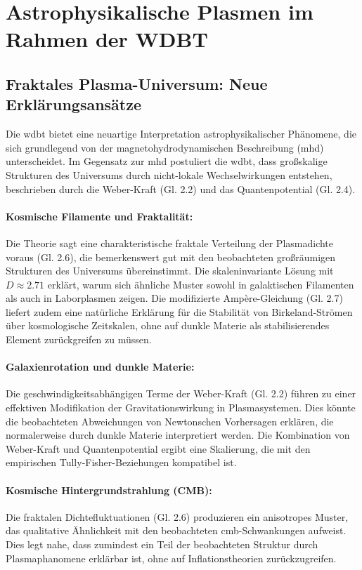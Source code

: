 \chapter{Astrophysikalische Plasmen im Rahmen der WDBT}
\section{Fraktales Plasma-Universum: Neue Erklärungsansätze}
Die \gls{wdbt} bietet eine neuartige Interpretation astrophysikalischer Phänomene, die sich grundlegend von der magnetohydrodynamischen Beschreibung (\gls{mhd}) unterscheidet. Im Gegensatz zur \gls{mhd}
postuliert die \gls{wdbt}, dass großskalige Strukturen des Universums durch nicht-lokale Wechselwirkungen entstehen, beschrieben durch die Weber-Kraft (Gl. 2.2) und das Quantenpotential (Gl. 2.4).

\subsubsection{Kosmische Filamente und Fraktalität:}
Die Theorie sagt eine charakteristische fraktale Verteilung der Plasmadichte voraus (Gl. 2.6), die bemerkenswert gut mit den beobachteten großräumigen Strukturen des Universums übereinstimmt. Die
skaleninvariante Lösung mit $D \approx 2.71$ erklärt, warum sich ähnliche Muster sowohl in galaktischen Filamenten als auch in Laborplasmen zeigen. Die modifizierte Ampère-Gleichung (Gl. 2.7) liefert
zudem eine natürliche Erklärung für die Stabilität von Birkeland-Strömen über kosmologische Zeitskalen, ohne auf dunkle Materie als stabilisierendes Element zurückgreifen zu müssen.

\subsubsection{Galaxienrotation und dunkle Materie:}
Die geschwindigkeitsabhängigen Terme der Weber-Kraft (Gl. 2.2) führen zu einer effektiven Modifikation der Gravitationswirkung in Plasmasystemen. Dies könnte die beobachteten Abweichungen von
Newtonschen Vorhersagen erklären, die normalerweise durch dunkle Materie interpretiert werden. Die Kombination von Weber-Kraft und Quantenpotential ergibt eine Skalierung, die mit den empirischen
Tully-Fisher-Beziehungen kompatibel ist.

\subsubsection{Kosmische Hintergrundstrahlung (CMB):}
Die fraktalen Dichtefluktuationen (Gl. 2.6) produzieren ein anisotropes Muster, das qualitative Ähnlichkeit mit den beobachteten \gls{cmb}-Schwankungen aufweist. Dies legt nahe, dass zumindest ein
Teil der beobachteten Struktur durch Plasmaphanomene erklärbar ist, ohne auf Inflationstheorien zurückzugreifen.

